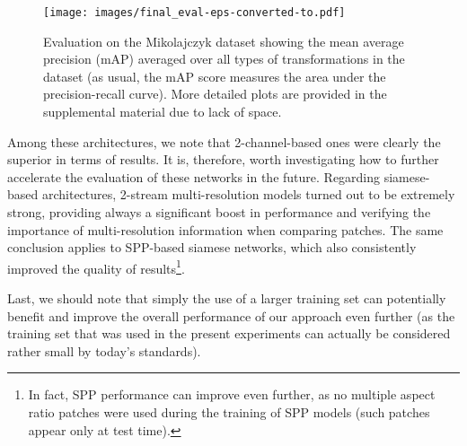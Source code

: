\documentclass[10pt,twocolumn,letterpaper]{article}
\newcommand*{\USEIMAGES}{}
\begin{document}
\ifdefined\USEIMAGES
\begin{figure}
\vspace{-5pt}
  \texttt{[image: images/final\_eval-eps-converted-to.pdf]}
\caption{Evaluation on the Mikolajczyk dataset \cite{MS05} showing the mean average precision (mAP) averaged over all types of transformations in the dataset (as usual, the mAP score measures the area under the precision-recall curve).
More detailed plots are provided  in the supplemental material due to lack of space.}
\label{fig:local_descriptors}
\vspace{-15pt}
\end{figure}
\fi

Among these architectures, we note that 2-channel-based ones were clearly the superior in terms of results. It  is, therefore, worth investigating how to further accelerate the evaluation of these networks in the future. Regarding siamese-based architectures, 2-stream multi-resolution models turned out to be extremely strong,  providing always a significant boost in performance and verifying the importance of multi-resolution information when comparing patches. The same conclusion applies to SPP-based siamese networks, which  also consistently  improved the quality of  results\footnote{In fact, SPP performance can improve even further, as no multiple aspect ratio patches were used during the training of SPP models (such patches appear only at test time).}. 

Last, we should note that simply the use of a larger training set can potentially   benefit and improve the overall performance of our approach  even further (as the training set that was used in the  present experiments can actually be considered rather small by today's standards).

{\small


}
\end{document}
